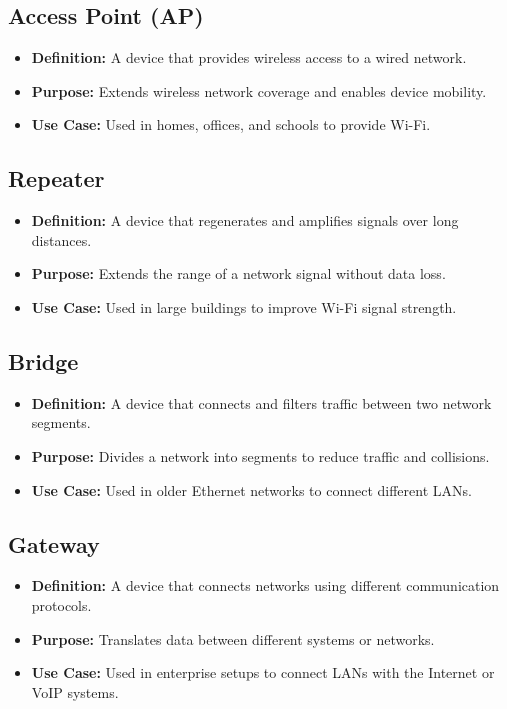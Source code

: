 \subsection{Access Point (AP)}
\begin{itemize}[leftmargin=1.5cm]
  \item \textbf{Definition:} A device that provides wireless access to a wired network.
  \item \textbf{Purpose:} Extends wireless network coverage and enables device mobility.
  \item \textbf{Use Case:} Used in homes, offices, and schools to provide Wi-Fi.
\end{itemize}

\subsection{Repeater}
\begin{itemize}[leftmargin=1.5cm]
  \item \textbf{Definition:} A device that regenerates and amplifies signals over long distances.
  \item \textbf{Purpose:} Extends the range of a network signal without data loss.
  \item \textbf{Use Case:} Used in large buildings to improve Wi-Fi signal strength.
\end{itemize}

\subsection{Bridge}
\begin{itemize}[leftmargin=1.5cm]
  \item \textbf{Definition:} A device that connects and filters traffic between two network segments.
  \item \textbf{Purpose:} Divides a network into segments to reduce traffic and collisions.
  \item \textbf{Use Case:} Used in older Ethernet networks to connect different LANs.
\end{itemize}

\subsection{Gateway}
\begin{itemize}[leftmargin=1.5cm]
  \item \textbf{Definition:} A device that connects networks using different communication protocols.
  \item \textbf{Purpose:} Translates data between different systems or networks.
  \item \textbf{Use Case:} Used in enterprise setups to connect LANs with the Internet or VoIP systems.
\end{itemize}


